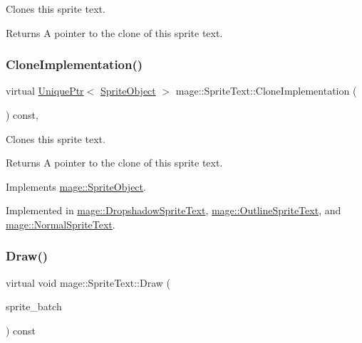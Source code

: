 Clones this sprite text.

\begin{DoxyReturn}{Returns}
A pointer to the clone of this sprite text. 
\end{DoxyReturn}
\hypertarget{classmage_1_1_sprite_text_a2b9f59a1730f8b9691f173251a2b4944}{}\label{classmage_1_1_sprite_text_a2b9f59a1730f8b9691f173251a2b4944} 
\subsubsection{\texorpdfstring{Clone\+Implementation()}{CloneImplementation()}}
{\footnotesize\ttfamily virtual \hyperlink{namespacemage_a3316d7143a973e37adf1110f2e80ca31}{Unique\+Ptr}$<$ \hyperlink{classmage_1_1_sprite_object}{Sprite\+Object} $>$ mage\+::\+Sprite\+Text\+::\+Clone\+Implementation (\begin{DoxyParamCaption}{ }\end{DoxyParamCaption}) const\hspace{0.3cm}{\ttfamily [private]}, {}}

Clones this sprite text.

\begin{DoxyReturn}{Returns}
A pointer to the clone of this sprite text. 
\end{DoxyReturn}


Implements \hyperlink{classmage_1_1_sprite_object_acbbe3d5894e5a43df411b7e5785ae174}{mage\+::\+Sprite\+Object}.



Implemented in \hyperlink{classmage_1_1_dropshadow_sprite_text_ae4b94b4120a9cae6bae11b61e7aed39b}{mage\+::\+Dropshadow\+Sprite\+Text}, \hyperlink{classmage_1_1_outline_sprite_text_af8d29408abb61c05a23499bf37c4c7b0}{mage\+::\+Outline\+Sprite\+Text}, and \hyperlink{classmage_1_1_normal_sprite_text_a261996eafdc02f39c6c57eb2b7ec2cea}{mage\+::\+Normal\+Sprite\+Text}.

\hypertarget{classmage_1_1_sprite_text_a45d5ac8410d5a46b26e8491946a2ad9e}{}\label{classmage_1_1_sprite_text_a45d5ac8410d5a46b26e8491946a2ad9e} 
\subsubsection{\texorpdfstring{Draw()}{Draw()}}
{\footnotesize\ttfamily virtual void mage\+::\+Sprite\+Text\+::\+Draw (\begin{DoxyParamCaption}\item[{Sprite\+Batch \&}]{sprite\+\_\+batch }\end{DoxyParamCaption}) const\hspace{0.3cm}{\ttfamily [pure virtual]}}

